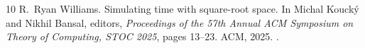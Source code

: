 \documentclass[a4paper,UKenglish,cleveref, autoref, thm-restate, numberwithinsect]{lipics-v2021}
\begin{document}
\begin{thebibliography}{10}
R.~Ryan Williams.
\newblock Simulating time with square-root space.
\newblock In Michal Kouck{\'{y}} and Nikhil Bansal, editors, {\em Proceedings
  of the 57th Annual {ACM} Symposium on Theory of Computing, {STOC} 2025},
  pages 13--23. {ACM}, 2025.
\newblock \href {https://doi.org/10.1145/3717823.3718225}
  {}.

\end{thebibliography}
\end{document}
